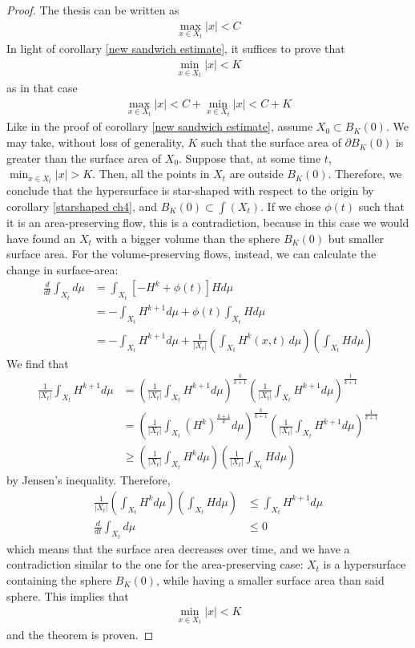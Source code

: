 \begin{proof}
	The thesis can be written as 
	\begin{align*}
		\max_{x\in X_t} |x| < C
	\end{align*}
	In light of corollary \ref{new sandwich estimate}, it suffices to prove that 
	\begin{align*}
		\min_{x\in X_t} |x| < K
	\end{align*}
	as in that case 
	\begin{align*}
		\max_{x\in X_t} |x| < C + \min_{x\in X_t} |x| < C+K
	\end{align*}
	Like in the proof of corollary \ref{new sandwich estimate}, assume $X_0\subset B_K(0)$. We may take, without loss of generality, $K$ such that the surface area of $\partial B_K(0)$ is greater than the surface area of $X_0$. 
	Suppose that, at some time $t$, $\min_{x\in X_t} |x| > K$. Then, all the points in $X_t$ are outside $B_K(0)$. Therefore, we conclude that the hypersurface is star-shaped with respect to the origin by corollary \ref{starshaped ch4}, and $B_K(0)\subset \int(X_t)$. If we chose $\phi(t)$ such that it is an area-preserving flow, this is a contradiction, because in this case we would have found an $X_t$ with a bigger volume than the sphere $B_K(0)$ but smaller surface area. For the volume-preserving flows, instead, we can calculate the change in surface-area: 
	\begin{align*}
		\frac{d}{d t}\int_{X_t} d\mu &=  \int_{X_t}  \left[- H^k + \phi(t)\right] H d\mu \\
		&= - \int_{X_t}  H^{k+1} d\mu  + \phi(t)\int_{X_t} H d\mu\\
		&= - \int_{X_t}  H^{k+1} d\mu  + \frac{1}{|X_t|}\left(\int_{X_t} H^k(x, t) \, d\mu\right)\left(\int_{X_t} H d\mu\right)
	\end{align*}
	We find that 
	\begin{align*}
		\frac{1}{|X_t|}\int_{X_t}  H^{k+1} d\mu &=\left(\frac{1}{|X_t|}\int_{X_t}  H^{k+1} d\mu\right)^{\frac{k}{k+1}}\left(\frac{1}{|X_t|}\int_{X_t}  H^{k+1} d\mu\right)^{\frac{1}{k+1}}\\ &=\left(\frac{1}{|X_t|}\int_{X_t}  \left(H^{k}\right)^{\frac{k+1}{k}} d\mu\right)^{\frac{k}{k+1}}  \left(\frac{1}{|X_t|}\int_{X_t}  H^{k+1} d\mu\right)^{\frac{1}{k+1}}\\
		&\geq \left(\frac{1}{|X_t|}\int_{X_t}  H^{k} d\mu\right) \left(\frac{1}{|X_t|}\int_{X_t}  H d\mu\right)
	\end{align*}
	by Jensen's inequality. Therefore, 
	\begin{align*}
		\frac{1}{|X_t|} \left(\int_{X_t}  H^{k} d\mu\right) \left(\int_{X_t}  H d\mu\right)&\leq \int_{X_t}  H^{k+1} d\mu\\
		\frac{d}{d t}\int_{X_t} d\mu &\leq 0
	\end{align*}
	which means that the surface area decreases over time, and we have a contradiction similar to the one for the area-preserving case: $X_t$ is a hypersurface containing the sphere $B_K(0)$, while having a smaller surface area than said sphere. This implies that 
	\begin{align*}
		\min_{x\in X_t} |x| < K
	\end{align*}
	and the theorem is proven. 
\end{proof}


